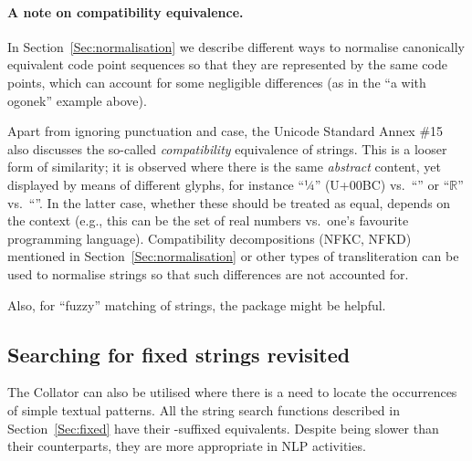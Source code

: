 \documentclass[nojss]{jss}\usepackage[]{graphicx}\usepackage[]{color}
\begin{document}
\paragraph{A note on compatibility equivalence.}
In Section~\ref{Sec:normalisation} we describe different ways to normalise
canonically equivalent code point sequences so that they are
represented by the same code points, which can account for some negligible
differences (as in the ``a with ogonek'' example above).

Apart from ignoring punctuation and case, the Unicode Standard Annex \#15 \citep{usa15:normalization}
also discusses the so-called \textit{compatibility} equivalence of strings.
This is a looser form of similarity; it is observed where
there is the same \textit{abstract} content, yet displayed
by means of different glyphs, for instance ``¼'' (U+00BC) vs.~``''
or ``$\mathbb{R}$'' vs.~``''.
In the latter case, whether these should be treated as equal,
depends on the context (e.g., this can be the set of real numbers
vs.~one's favourite programming language).
Compatibility decompositions (NFKC, NFKD)
mentioned in Section~\ref{Sec:normalisation}
or other types of transliteration can be used to normalise strings so that
such differences are not accounted for.

Also, for ``fuzzy'' matching of strings,
the  package \citep{stringdist} might be helpful.













\subsection{Searching for fixed strings revisited}

The  Collator can also be utilised
where there is a need to locate the occurrences of simple textual patterns.
All the string search functions described in Section~\ref{Sec:fixed}
have their -suffixed equivalents.
Despite being slower than their  counterparts,
they are more appropriate in NLP activities.
\end{document}
